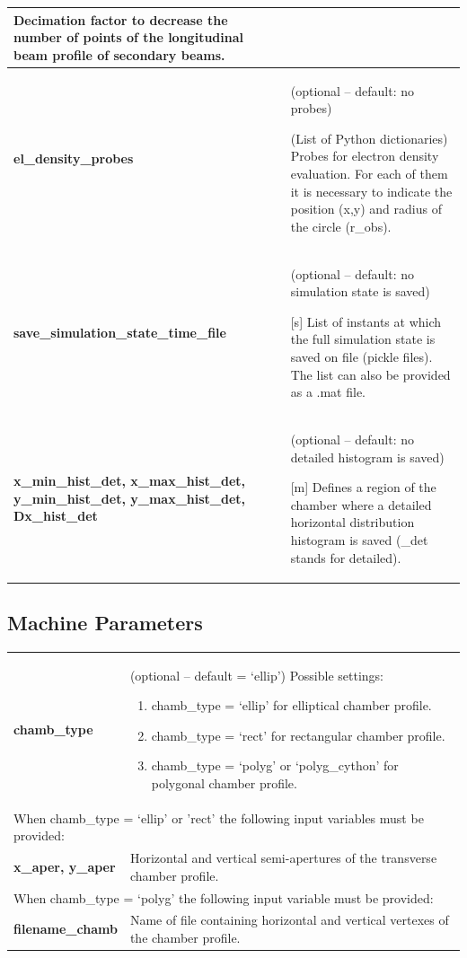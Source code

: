 \documentclass[a4paper,12pt]{article}
\begin{document}
\begin{longtable}{p{}p{}}
Decimation factor to decrease the number of points of the longitudinal beam profile of secondary beams.\\ \hline
\textbf{el\_density\_probes}& 	(optional -- default: no probes)

(List of Python dictionaries) Probes for electron density evaluation. For each of them it is necessary to indicate the position (x,y) and radius of the circle (r\_obs).\\ \hline
\textbf{save\_simulation\_state\_time\_file}&	(optional -- default: no simulation state is saved)

[s] List of instants at which the full simulation state is saved on file (pickle files). The list can also be provided as a .mat file.\\ \hline
\textbf{x\_min\_hist\_det,  x\_max\_hist\_det,  y\_min\_hist\_det,  y\_max\_hist\_det,  Dx\_hist\_det}&	(optional -- default: no detailed histogram is saved)

[m] Defines a region of the chamber where a detailed horizontal distribution histogram is saved (\_det stands for detailed). \\
\hline
\end{longtable}



\newpage\subsection{Machine Parameters}

\begin{longtable}{p{}p{}}
\hline\endfirsthead\hline\endhead\rowcolor{Gray}
\multicolumn{2}{p{.97\textwidth}}{\textbf{Chamber profile description}}
\\ \hline
\textbf{chamb\_type} & (optional -- default = `ellip') \newline
Possible settings:
\begin{enumerate}
\item chamb\_type = `ellip' for elliptical chamber profile.
\item chamb\_type = `rect' for rectangular chamber profile.
\item chamb\_type = `polyg' or `polyg\_cython' for polygonal chamber profile.
\end{enumerate}
\\ \hline
\multicolumn{2}{p{.97\textwidth}}{When chamb\_type = `ellip' or  'rect' the following input variables must be provided:}
\\ \hline
\textbf{x\_aper, y\_aper} & Horizontal and vertical semi-apertures of the transverse chamber profile.
\\ \hline
\multicolumn{2}{p{.97\textwidth}}{When chamb\_type = `polyg' the following input variable must be provided:}
\\ \hline
\textbf{filename\_chamb} & Name of file containing horizontal and vertical vertexes of the chamber profile.
\\
\hline
\end{longtable}
\end{document}
